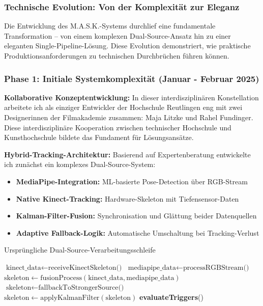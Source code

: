 \subsubsection{Technische Evolution: Von der Komplexität zur Eleganz}

Die Entwicklung des M.A.S.K.-Systems durchlief eine fundamentale Transformation – von einem komplexen Dual-Source-Ansatz hin zu einer eleganten Single-Pipeline-Lösung. Diese Evolution demonstriert, wie praktische Produktionsanforderungen zu technischen Durchbrüchen führen können.

\newpage

\subsubsection{Phase 1: Initiale Systemkomplexität (Januar - Februar 2025)}

\textbf{Kollaborative Konzeptentwicklung:}
In dieser interdisziplinären Konstellation arbeitete ich als einziger Entwickler der Hochschule Reutlingen eng mit zwei Designerinnen der Filmakademie zusammen: Maja Litzke und Rahel Fundinger. Diese interdisziplinäre Kooperation zwischen technischer Hochschule und Kunsthochschule bildete das Fundament für Lösungsansätze.

\textbf{Hybrid-Tracking-Architektur:}
Basierend auf Expertenberatung entwickelte ich zunächst ein komplexes Dual-Source-System:
\begin{itemize}
    \item \textbf{MediaPipe-Integration:} ML-basierte Pose-Detection über RGB-Stream
    \item \textbf{Native Kinect-Tracking:} Hardware-Skeleton mit Tiefensensor-Daten
    \item \textbf{Kalman-Filter-Fusion:} Synchronisation und Glättung beider Datenquellen
    \item \textbf{Adaptive Fallback-Logik:} Automatische Umschaltung bei Tracking-Verlust
\end{itemize}

\begin{algorithm}[H]
\caption{Ursprüngliche Dual-Source-Verarbeitungsschleife}
\begin{algorithmic}[1]
    \State $\text{kinect\_data} \leftarrow \text{receiveKinectSkeleton()}$
    \State $\text{mediapipe\_data} \leftarrow \text{processRGBStream()}$
        \State $\text{skeleton} \leftarrow \text{fusionProcess}(\text{kinect\_data}, \text{mediapipe\_data})$
    \Else
        \State $\text{skeleton} \leftarrow \text{fallbackToStrongerSource()}$
    \EndIf
    \State $\text{skeleton} \leftarrow \text{applyKalmanFilter}(\text{skeleton})$
    \State \textbf{evaluateTriggers}()
\end{algorithmic}
\end{algorithm}

